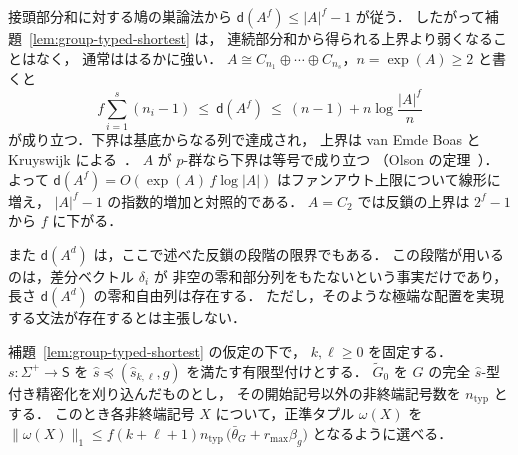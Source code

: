 \begin{remark}[零和定数の大きさ]
\label{rem:davenport-size}
接頭部分和に対する鳩の巣論法から $\mathsf d(A^f)\le|A|^f-1$ が従う．
したがって補題~\ref{lem:group-typed-shortest} は，
連続部分和から得られる上界より弱くなることはなく，
通常ははるかに強い．
$A\cong C_{n_1}\oplus\cdots\oplus C_{n_s}$，$n=\exp(A)\ge2$ と書くと
\[
 f\sum_{i=1}^{s}(n_i-1)\ \le\ \mathsf d(A^f)\ \le\
 (n-1)+n\log\frac{|A|^f}{n}
\]
が成り立つ．下界は基底からなる列で達成され，
上界は van Emde Boas と Kruyswijk による~\cite[Proposition~5.1.8, Theorem~5.5.5]{GeroldingerHalterKoch2006}．
$A$ が $p$-群なら下界は等号で成り立つ
（Olson の定理~\cite[Theorem~5.5.9]{GeroldingerHalterKoch2006}）．
よって $\mathsf d(A^f)=O(\exp(A)\,f\log|A|)$ はファンアウト上限について線形に増え，
$|A|^f-1$ の指数的増加と対照的である．
$A=C_2$ では反鎖の上界は $2^f-1$ から $f$ に下がる．

また $\mathsf d(A^d)$ は，ここで述べた反鎖の段階の限界でもある．
この段階が用いるのは，差分ベクトル $\delta_i$ が
非空の零和部分列をもたないという事実だけであり，
長さ $\mathsf d(A^d)$ の零和自由列は存在する．
ただし，そのような極端な配置を実現する文法が存在するとは主張しない．
\end{remark}

\begin{lemma}[窓・アーベル群型付けの短い正準タプル]
\label{lem:window-abelian-short}
補題~\ref{lem:group-typed-shortest} の仮定の下で，
$k,\ell\ge0$ を固定する．
$s:\Sigma^+\to\mathsf S$ を
$\widehat{s}\preceq(\widehat{s}_{k,\ell},g)$
を満たす有限型付けとする．
$\widetilde G_0$ を $G$ の完全 $\widehat{s}$-型付き精密化を刈り込んだものとし，
その開始記号以外の非終端記号数を $n_{\mathrm{typ}}$ とする．
このとき各非終端記号 $X$ について，正準タプル
$\omega(X)$ を
\(\|\omega(X)\|_1\le f(k+\ell+1)n_{\mathrm{typ}}\, \bigl(\bar\theta_G+r_{\max}\beta_g\bigr)\)
となるように選べる．
\end{lemma}

